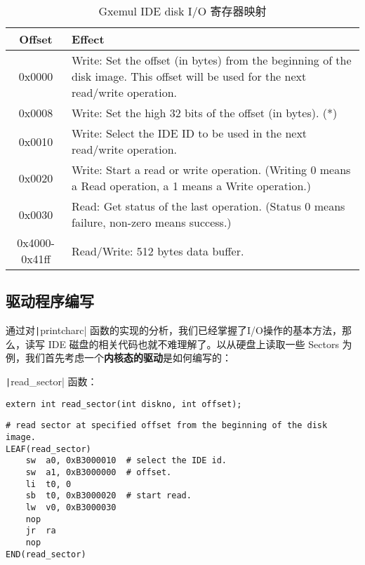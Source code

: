 \begin{table}[htbp]
\caption{Gxemul IDE disk I/O 寄存器映射}\label{lab5-table-disk-mem-map}
\centering
\begin{tabular}{|c|p{12cm}|}
  \hline
    Offset & Effect \\
  \hline
    0x0000 & Write: Set the offset (in bytes) from the beginning of the disk image. This offset will be used for the next read/write operation. \\
  \hline
    0x0008 & Write: Set the high 32 bits of the offset (in bytes). (*) \\
  \hline
    0x0010 & Write: Select the IDE ID to be used in the next read/write operation. \\
  \hline
    0x0020 & Write: Start a read or write operation. (Writing 0 means a Read operation, a 1 means a Write operation.) \\
  \hline
    0x0030 & Read: Get status of the last operation. (Status 0 means failure, non-zero means success.) \\
  \hline
    0x4000-0x41ff  &  Read/Write: 512 bytes data buffer. \\
  \hline
\end{tabular}
\end{table}

\subsection{驱动程序编写}

通过对\texttt|printcharc| 函数的实现的分析，我们已经掌握了I/O操作的基本方法，那么，读写 IDE 磁盘的相关代码也就不难理解了。以从硬盘上读取一些 Sectors 为例，我们首先考虑一个\textbf{内核态的驱动}是如何编写的：

\texttt|read_sector| 函数：

\begin{verbatim}
extern int read_sector(int diskno, int offset);
\end{verbatim}


\begin{verbatim}
# read sector at specified offset from the beginning of the disk image.
LEAF(read_sector)
    sw  a0, 0xB3000010  # select the IDE id.
    sw  a1, 0xB3000000  # offset.
    li  t0, 0
    sb  t0, 0xB3000020  # start read.
    lw  v0, 0xB3000030
    nop
    jr  ra
    nop
END(read_sector)
\end{verbatim}

